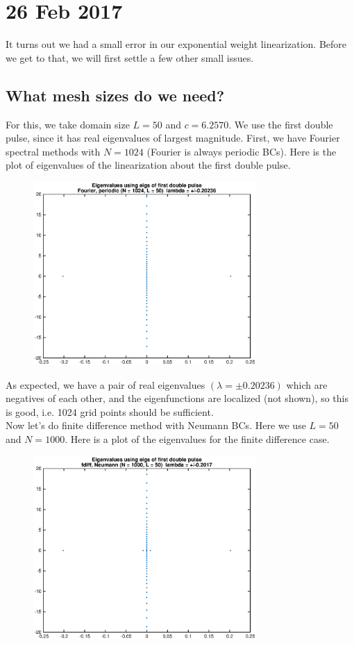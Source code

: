 \documentclass[12pt]{article}
\begin{document}
\section*{26 Feb 2017}
It turns out we had a small error in our exponential weight linearization. Before we get to that, we will first settle a few other small issues.

\subsection*{What mesh sizes do we need?}
For this, we take domain size $L = 50$ and $c = 6.2570$. We use the first double pulse, since it has real eigenvalues of largest magnitude. First, we have Fourier spectral methods with $N = 1024$ (Fourier is always periodic BCs). Here is the plot of eigenvalues of the linearization about the first double pulse.

\begin{figure}[H]
\includegraphics[width=8.5cm]{d1fouriereig.eps}
\end{figure}

As expected, we have a pair of real eigenvalues $(\lambda = \pm 0.20236)$ which are negatives of each other, and the eigenfunctions are localized (not shown), so this is good, i.e. 1024 grid points should be sufficient.\\

Now let's do finite difference method with Neumann BCs. Here we use $L = 50$ and $N = 1000$. Here is a plot of the eigenvalues for the finite difference case. 

\begin{figure}[H]
\includegraphics[width=8.5cm]{d1fdiffeig1000.eps}
\end{figure}
\end{document}
